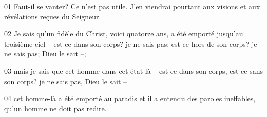 01 Faut-il se vanter? Ce n’est pas utile. J’en viendrai pourtant aux visions et aux révélations reçues du Seigneur.

02 Je sais qu’un fidèle du Christ, voici quatorze ans, a été emporté jusqu’au troisième ciel – est-ce dans son corps? je ne sais pas; est-ce hors de son corps? je ne sais pas; Dieu le sait –;

03 mais je sais que cet homme dans cet état-là – est-ce dans son corps, est-ce sans son corps? je ne sais pas, Dieu le sait –

04 cet homme-là a été emporté au paradis et il a entendu des paroles ineffables, qu’un homme ne doit pas redire.
